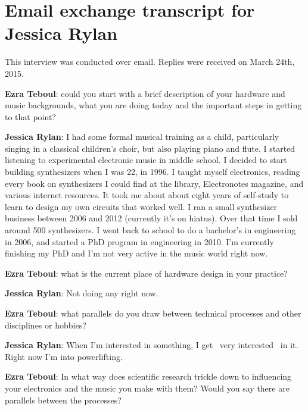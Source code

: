 \newpage

\clearpage 
\section{Email exchange transcript for Jessica Rylan}
This interview was conducted over email. Replies were received on March 24th, 2015. 

\textbf{Ezra Teboul}: could you start with a brief description of your hardware and music backgrounds, what you are doing today and the important steps in getting to that point? 

\textbf{Jessica Rylan}: I had some formal musical training as a child, particularly singing in a classical children's choir, but also playing piano and flute. I started listening to experimental electronic music in middle school. I decided to start building synthesizers when I was 22, in 1996. I taught myself electronics, reading every book on synthesizers I could find at the library, Electronotes magazine, and various internet resources. It took me about about eight years of self-study to learn to design my own circuits that worked well. I ran a small synthesizer business between 2006 and 2012 (currently it's on hiatus). Over that time I sold around 500 synthesizers. I went back to school to do a bachelor's in engineering in 2006, and started a PhD program in engineering in 2010. I'm currently finishing my PhD and I'm not very active in the music world right now.

\textbf{Ezra Teboul}: what is the current place of hardware design in your practice? 

\textbf{Jessica Rylan}: Not doing any right now.

\textbf{Ezra Teboul}: what parallels do you draw between technical processes and other disciplines or hobbies? 

\textbf{Jessica Rylan}: When I'm interested in something, I get ~very interested~ in it. Right now I'm into powerlifting.

\textbf{Ezra Teboul}: In what way does scientific research trickle down to influencing your electronics and the music you make with them? Would you say there are parallels between the processes? 
            
